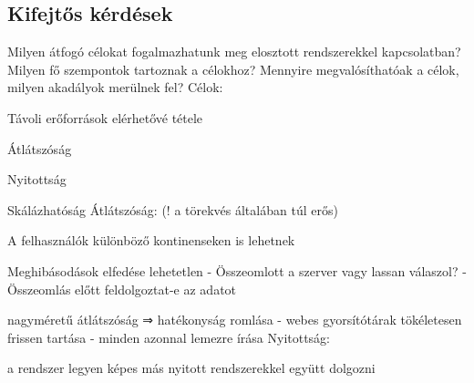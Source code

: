 \documentclass[twoside, a4paper, 12pt]{article}
\begin{document}
                                                                \subsection{Kifejtős kérdések}
                                                                \begin{description}
                                                                    \item  Milyen átfogó célokat fogalmazhatunk meg elosztott rendszerekkel kapcsolatban? Milyen fő szempontok tartoznak a célokhoz? Mennyire megvalósíthatóak a célok, milyen akadályok merülnek fel?
                                                                        Célok:
                                                                    \item Távoli erőforrások elérhetővé tétele
                                                                    \item Átlátszóság
                                                                    \item Nyitottság
                                                                    \item Skálázhatóság
                                                                        Átlátszóság: (! a törekvés általában túl erős)
                                                                    \item A felhasználók különböző kontinenseken is lehetnek 
                                                                    \item Meghibásodások elfedése lehetetlen
                                                                        - Összeomlott a szerver vagy lassan válaszol? 
                                                                        - Összeomlás előtt feldolgoztat-e az adatot
                                                                    \item nagyméretű átlátszóság ⇒ hatékonyság romlása
                                                                        - webes gyorsítótárak tökéletesen frissen tartása
                                                                        - minden azonnal lemezre írása
                                                                        Nyitottság: 
                                                                    \item a rendszer legyen képes más nyitott rendszerekkel együtt dolgozni

\end{description}
\end{document}
